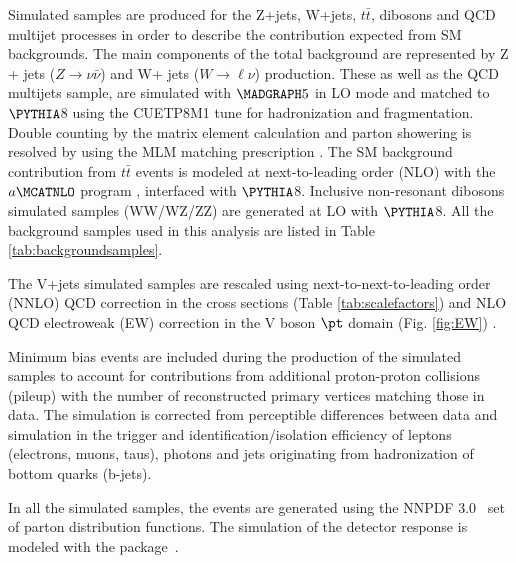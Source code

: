 \par Simulated samples are produced for the Z+jets, W+jets, $t\bar{t}$, dibosons and QCD multijet processes in order to describe the contribution expected from SM backgrounds. The main components of the total background are represented by Z + jets ($Z \rightarrow \nu \bar{\nu}$) and W+ jets ($W \rightarrow \ell \nu$) production. These as well as the QCD multijets sample, are simulated with $\MADGRAPH 5$ in LO mode and matched to $\PYTHIA$8 using the CUETP8M1 tune for hadronization and fragmentation. Double counting by the matrix element calculation and parton showering is resolved by using the MLM matching prescription \cite{Mangano:2002ea}. The SM background contribution from $t\bar{t}$ events is modeled at next-to-leading order (NLO) with the $a\MCATNLO$ program \cite{Frixione:2002ik}, interfaced with $\PYTHIA$8. Inclusive non-resonant dibosons simulated samples (WW/WZ/ZZ) are generated at LO with $\PYTHIA$8. All the background samples used in this analysis are listed in Table \ref{tab:backgroundsamples}.

\par The V+jets simulated samples are rescaled using next-to-next-to-leading order (NNLO) QCD correction in the cross sections (Table \ref{tab:scalefactors}) and NLO QCD electroweak (EW) correction in the V boson $\pt$ domain (Fig. \ref{fig:EW}) \cite{Kallweit:2015dum}. 

\par Minimum bias events are included during the production of the simulated samples to account for contributions from additional proton-proton collisions (pileup) with the number of reconstructed primary vertices matching those in data. The simulation is corrected from perceptible differences between data and simulation in the trigger and identification/isolation efficiency of leptons (electrons, muons, taus), photons and jets originating from hadronization of bottom quarks (b-jets).

\par In all the simulated samples, the events are generated using the NNPDF 3.0~\cite{Ball:2011mu} set of parton distribution functions. The simulation of the detector response is modeled with the \GEANTfour package~\cite{Agostinelli:2002hh}.

